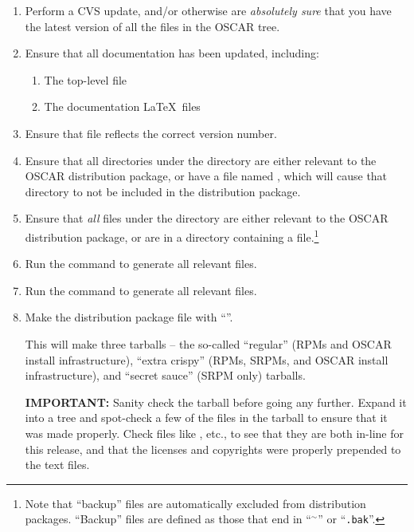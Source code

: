 \begin{enumerate}
  
\item Perform a CVS update, and/or otherwise are {\em absolutely sure}
  that you have the latest version of all the files in the OSCAR tree.
  
\item Ensure that all documentation has been updated, including:

  \begin{enumerate}
  \item The top-level  file
  \item The documentation \LaTeX\ files
  \end{enumerate}
  
\item Ensure that  file reflects the correct version
  number. 
  
\item Ensure that all directories under the  directory
  are either relevant to the OSCAR distribution package, or have a
  file named , which will cause that directory
  to not be included in the distribution package.
  
\item Ensure that {\em all} files under the  directory
  are either relevant to the OSCAR distribution package, or are in a
  directory containing a  file.\footnote{Note
    that ``backup'' files are automatically excluded from distribution
    packages.  ``Backup'' files are defined as those that end in
    ``{\tt $^{\sim}$}'' or ``{\tt .bak}''.}
  
\item Run the  command to generate all relevant
   files.

\item Run the  command to generate all relevant
   files.
  
\item Make the distribution package file with ``''.
  
  This will make three tarballs -- the so-called ``regular'' (RPMs and
  OSCAR install infrastructure), ``extra crispy'' (RPMs, SRPMs, and
  OSCAR install infrastructure), and ``secret sauce'' (SRPM only)
  tarballs.
  
  {\bf IMPORTANT:} Sanity check the tarball before going any further.
  Expand it into a tree and spot-check a few of the files in the
  tarball to ensure that it was made properly.  Check files like
  , etc., to see that they are both in-line for this
  release, and that the licenses and copyrights were properly
  prepended to the text files.
  

\end{enumerate}
